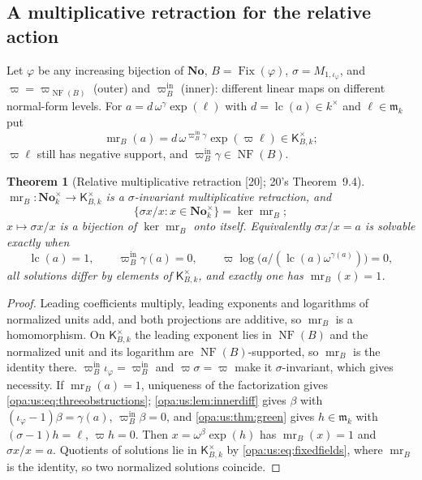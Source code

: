 \documentclass[11pt,oneside]{article}
\numberwithin{equation}{section}
\newtheorem{theorem}{Theorem}[section]
\theoremstyle{definition}
\theoremstyle{remark}
\newcommand{\No}{\mathbf{No}}
\newcommand{\mm}{\mathfrak m}
\newcommand{\lc}{\operatorname{lc}}
\newcommand{\Fix}{\operatorname{Fix}}
\newcommand{\src}[1]{\textup{\textsf{\small[#1]}}}
\newcommand{\NF}{\operatorname{NF}}
\begin{document}
\subsection{A multiplicative retraction for the relative action}\label{opa:us:sub:retraction}

Let $\varphi$ be any increasing bijection of $\No$, $B=\Fix(\varphi)$, $\sigma=M_{1,\iota_\varphi}$, and $\varpi=\varpi_{\NF(B)}$ (outer) and $\varpi^{\mathrm{in}}_B$
(inner): different linear maps on different normal-form levels. For $a=d\,\omega^\gamma\exp(\ell)$ with $d=\lc(a)\in k^\times$ and $\ell\in\mm_k$ put
\begin{equation}\label{opa:us:eq:retraction}
 \operatorname{mr}_B(a)=d\,\omega^{\varpi^{\mathrm{in}}_B\gamma}\exp(\varpi\ell)\in\mathsf K_{B,k}^\times ;
\end{equation}
$\varpi\ell$ still has negative support, and $\varpi^{\mathrm{in}}_B\gamma\in\NF(B)$.

\begin{theorem}[Relative multiplicative retraction \src{20}; 20's Theorem~9.4]\label{opa:us:thm:retraction}
$\operatorname{mr}_B:\No_k^\times\to\mathsf K_{B,k}^\times$ is a $\sigma$-invariant multiplicative retraction, and
\begin{equation}\label{opa:us:eq:relmultimage}
 \{\sigma x/x:x\in\No_k^\times\}=\ker\operatorname{mr}_B ;
\end{equation}
$x\mapsto\sigma x/x$ is a bijection of $\ker\operatorname{mr}_B$ onto itself. Equivalently $\sigma x/x=a$ is solvable exactly when
\begin{equation}\label{opa:us:eq:threeobstructions}
 \lc(a)=1,\qquad \varpi^{\mathrm{in}}_B\gamma(a)=0,\qquad \varpi\log\bigl(a/(\lc(a)\omega^{\gamma(a)})\bigr)=0,
\end{equation}
all solutions differ by elements of $\mathsf K_{B,k}^\times$, and exactly one has $\operatorname{mr}_B(x)=1$.
\end{theorem}
\begin{proof}
Leading coefficients multiply, leading exponents and logarithms of normalized units add, and both projections are additive, so $\operatorname{mr}_B$ is a
homomorphism. On $\mathsf K_{B,k}^\times$ the leading exponent lies in $\NF(B)$ and the normalized unit and its logarithm are $\NF(B)$-supported, so
$\operatorname{mr}_B$ is the identity there. $\varpi^{\mathrm{in}}_B\iota_\varphi=\varpi^{\mathrm{in}}_B$ and $\varpi\sigma=\varpi$ make it $\sigma$-invariant, which gives
necessity. If $\operatorname{mr}_B(a)=1$, uniqueness of the factorization gives \eqref{opa:us:eq:threeobstructions}; \cref{opa:us:lem:innerdiff} gives
$\beta$ with $(\iota_\varphi-1)\beta=\gamma(a)$, $\varpi^{\mathrm{in}}_B\beta=0$, and \cref{opa:us:thm:green} gives $h\in\mm_k$ with $(\sigma-1)h=\ell$, $\varpi h=0$.
Then $x=\omega^\beta\exp(h)$ has $\operatorname{mr}_B(x)=1$ and $\sigma x/x=a$. Quotients of solutions lie in $\mathsf K_{B,k}^\times$ by
\eqref{opa:us:eq:fixedfields}, where $\operatorname{mr}_B$ is the identity, so two normalized solutions coincide.
\end{proof}
\end{document}
